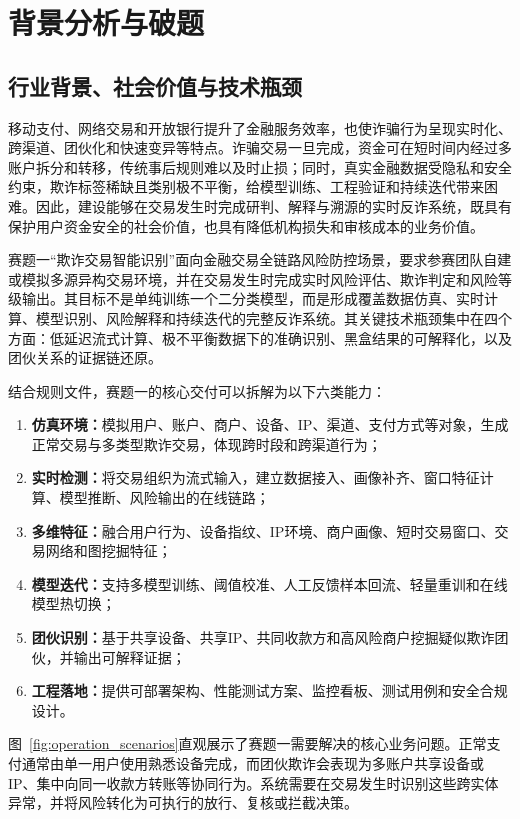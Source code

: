\section{背景分析与破题}
\label{sec:intro}

\subsection{行业背景、社会价值与技术瓶颈}

移动支付、网络交易和开放银行提升了金融服务效率，也使诈骗行为呈现实时化、跨渠道、团伙化和快速变异等特点。诈骗交易一旦完成，资金可在短时间内经过多账户拆分和转移，传统事后规则难以及时止损；同时，真实金融数据受隐私和安全约束，欺诈标签稀缺且类别极不平衡，给模型训练、工程验证和持续迭代带来困难。因此，建设能够在交易发生时完成研判、解释与溯源的实时反诈系统，既具有保护用户资金安全的社会价值，也具有降低机构损失和审核成本的业务价值。

赛题一“欺诈交易智能识别”面向金融交易全链路风险防控场景，要求参赛团队自建或模拟多源异构交易环境，并在交易发生时完成实时风险评估、欺诈判定和风险等级输出。其目标不是单纯训练一个二分类模型，而是形成覆盖数据仿真、实时计算、模型识别、风险解释和持续迭代的完整反诈系统。其关键技术瓶颈集中在四个方面：低延迟流式计算、极不平衡数据下的准确识别、黑盒结果的可解释化，以及团伙关系的证据链还原。

结合规则文件，赛题一的核心交付可以拆解为以下六类能力：

\begin{enumerate}
  \item \textbf{仿真环境：}模拟用户、账户、商户、设备、IP、渠道、支付方式等对象，生成正常交易与多类型欺诈交易，体现跨时段和跨渠道行为；
  \item \textbf{实时检测：}将交易组织为流式输入，建立数据接入、画像补齐、窗口特征计算、模型推断、风险输出的在线链路；
  \item \textbf{多维特征：}融合用户行为、设备指纹、IP环境、商户画像、短时交易窗口、交易网络和图挖掘特征；
  \item \textbf{模型迭代：}支持多模型训练、阈值校准、人工反馈样本回流、轻量重训和在线模型热切换；
  \item \textbf{团伙识别：}基于共享设备、共享IP、共同收款方和高风险商户挖掘疑似欺诈团伙，并输出可解释证据；
  \item \textbf{工程落地：}提供可部署架构、性能测试方案、监控看板、测试用例和安全合规设计。
\end{enumerate}

图~\ref{fig:operation_scenarios}直观展示了赛题一需要解决的核心业务问题。正常支付通常由单一用户使用熟悉设备完成，而团伙欺诈会表现为多账户共享设备或IP、集中向同一收款方转账等协同行为。系统需要在交易发生时识别这些跨实体异常，并将风险转化为可执行的放行、复核或拦截决策。

